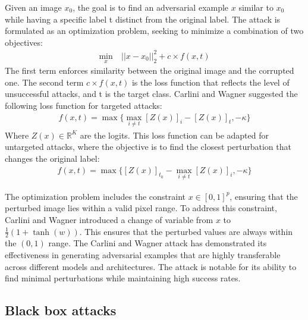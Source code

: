 \documentclass[11pt,twocolumn,letterpaper]{article}
\begin{document}
Given an image $x_0$, the goal is to find an adversarial example $x$ similar to $x_0$ while having a specific label t distinct from the original label. The attack is formulated as an optimization problem, seeking to minimize a combination of two objectives:
\begin{align*}
   \min_x &\ ||x - x_0||_2^2 + c \times f(x,t) %
\end{align*}
The first term enforces similarity between the original image and the corrupted one. The second term $ c \times f(x,t) $ is the loss function that reflects the level of unsuccessful attacks, and t is the target class. Carlini and Wagner suggested the following loss function for targeted attacks:
\begin{align*}
    f(x,t) = \max \{ \max_{i \neq t}[Z(x)]_i - [Z(x)]_t, -\kappa \}
\end{align*}
Where $Z(x) \in \mathbb{R}^K$ are the logits. 
This loss function can be adapted for untargeted attacks, where the objective is to find the closest perturbation that changes the original label:
\begin{align*}
    f(x,t) = \max \{[Z(x)]_{t_0} - \max_{i \neq t}[Z(x)]_i, -\kappa \}
\end{align*}

The optimization problem includes the constraint $ x \in [0,1]^p $, ensuring that the perturbed image lies within a valid pixel range. To address this constraint, Carlini and Wagner introduced a change of variable from $x$ to $\frac{1}{2} (1 + \tanh(w))$. 
This ensures that the perturbed values are always within the $(0,1)$ range.
The Carlini and Wagner attack has demonstrated its effectiveness in generating adversarial examples that are highly transferable across different models and architectures. The attack is notable for its ability to find minimal perturbations while maintaining high success rates.
\subsection{Black box attacks}

\paragraph{}
\end{document}
